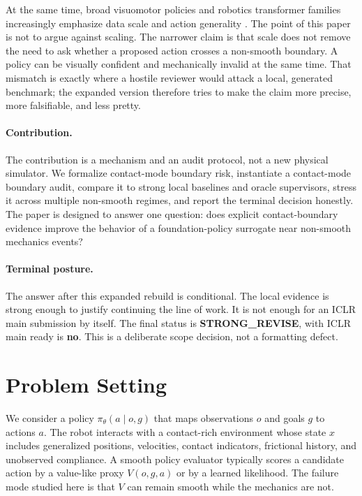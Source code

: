 \documentclass{article}
\newcommand{\terminal}{\textbf{STRONG\_REVISE}}
\begin{document}
At the same time, broad visuomotor policies and robotics transformer families increasingly emphasize data scale and action generality \citep{chi2023diffusion,brohan2022rt1,brohan2023rt2,openx2023rtx,octo2024,khazatsky2024droid}. The point of this paper is not to argue against scaling. The narrower claim is that scale does not remove the need to ask whether a proposed action crosses a non-smooth boundary. A policy can be visually confident and mechanically invalid at the same time. That mismatch is exactly where a hostile reviewer would attack a local, generated benchmark; the expanded version therefore tries to make the claim more precise, more falsifiable, and less pretty.

\paragraph{Contribution.}
The contribution is a mechanism and an audit protocol, not a new physical simulator. We formalize contact-mode boundary risk, instantiate a contact-mode boundary audit, compare it to strong local baselines and oracle supervisors, stress it across multiple non-smooth regimes, and report the terminal decision honestly. The paper is designed to answer one question: does explicit contact-boundary evidence improve the behavior of a foundation-policy surrogate near non-smooth mechanics events?

\paragraph{Terminal posture.}
The answer after this expanded rebuild is conditional. The local evidence is strong enough to justify continuing the line of work. It is not enough for an ICLR main submission by itself. The final status is \terminal, with ICLR main ready is \textbf{no}. This is a deliberate scope decision, not a formatting defect.

\section{Problem Setting}
We consider a policy $\pi_\theta(a\mid o, g)$ that maps observations $o$ and goals $g$ to actions $a$. The robot interacts with a contact-rich environment whose state $x$ includes generalized positions, velocities, contact indicators, frictional history, and unobserved compliance. A smooth policy evaluator typically scores a candidate action by a value-like proxy $V(o,g,a)$ or by a learned likelihood. The failure mode studied here is that $V$ can remain smooth while the mechanics are not.
\end{document}
